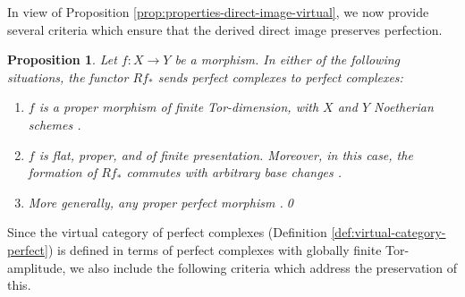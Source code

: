 \documentclass[JEP,XML,SOM,Unicode,published]{cedram}
\theoremstyle{plain}
\newtheorem{proposition}[theorem]{Proposition}
\theoremstyle{definition}
\begin{document}
In view of Proposition \ref{prop:properties-direct-image-virtual}, we now provide several criteria which ensure that the derived direct image preserves perfection.
\begin{proposition}\label{prop:perfect-conditions}
Let $f: X\to Y$ be a morphism. In either of the following situations, the functor $Rf_\ast$ sends perfect complexes to perfect complexes:
\begin{enumerate}
\item\label{item:perfect-conditions-1} $f$ is a proper morphism of finite Tor-dimension, with $X$ and $Y$ Noetherian schemes \cite[\href{https://stacks.math.columbia.edu/tag/0B6G}{0B6G}]{stacks-project} \cite[\href{https://stacks.math.columbia.edu/tag/0684}{0684}]{stacks-project}
\cite[\href{https://stacks.math.columbia.edu/tag/069C}{069C}]{stacks-project}.
\item\label{item:perfect-conditions-2} $f$ is flat, proper, and of finite presentation. Moreover, in this case, the formation of $Rf_\ast $ commutes with arbitrary base changes \cite[\href{https://stacks.math.columbia.edu/tag/0B91}{0B91}]{stacks-project}.
\item\label{item:perfect-conditions-3} More generally, any proper perfect morphism \cite[Ex.\,2.2(a)]{LipNee}.\qed
\end{enumerate}
\end{proposition}

Since the virtual category of perfect complexes (\cf Definition \ref{def:virtual-category-perfect}) is defined in terms of perfect complexes with globally finite Tor-amplitude, we also include the following criteria which address the preservation of this.
\end{document}
